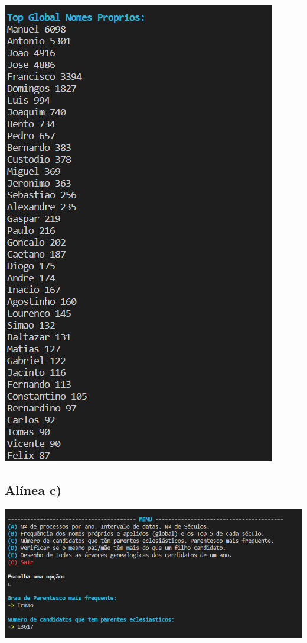 \documentclass[11pt,a4paper]{report}
\begin{document}
\begin{center}
	\includegraphics[scale=0.6]{images/b4}
	\end{center}

\newpage
\subsection*{ Alínea c)}

\begin{center}
	\includegraphics[scale=0.55]{images/c1}
	\end{center}
\end{document}
